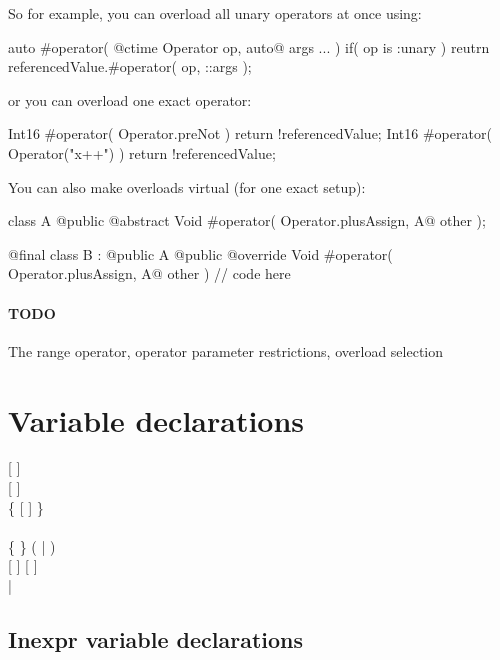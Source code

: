 So for example, you can overload all unary operators at once using:
\begin{code}
auto #operator( @ctime Operator op, auto@ args ... )
	if( op is :unary )
{
	reutrn referencedValue.#operator( op, ::args );
}
\end{code}

or you can overload one exact operator:
\begin{code}
Int16 #operator( Operator.preNot ) {
	return !referencedValue;	
}
Int16 #operator( Operator("x++") ) {
	return !referencedValue;	
}
\end{code}

You can also make overloads virtual (for one exact setup):
\begin{code}
class A {
	@public @abstract Void #operator( Operator.plusAssign, A@ other );
}

@final class B : @public A {
	@public @override Void #operator( Operator.plusAssign, A@ other ) {
		// code here	
	}
}
\end{code}

\paragraph{TODO} The range operator, operator parameter restrictions, overload selection

\section{Variable declarations}
\begin{grammar}
	   [  ] \\
	   [  ] \\
		\grLn \{ \kwd{,}  [  ] \} \kwd{;} \\
	\\
	 \{  \} (  |  ) \\
	  [  ] [ \kwd{!} ] \\
	  | \kwd{=}  \\
\end{grammar}

\subsection{Inexpr variable declarations}

